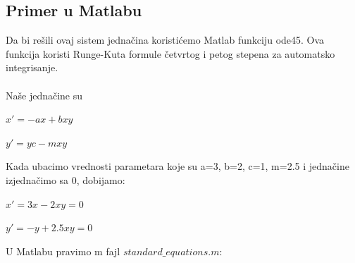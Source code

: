 \documentclass[a4paper]{article}
\begin{document}
\subsection{Primer u Matlabu}
\label{sub:std_primer}
Da bi rešili ovaj sistem jednačina koristićemo Matlab funkciju ode45. Ova funkcija koristi Runge-Kuta
formule četvrtog i petog stepena za automatsko integrisanje.\\ \\
 Naše jednačine su
	\begin{center}
		$x' = -ax + bxy$
	\end{center}
	\begin{center}
		$y' =yc - mxy$
	\end{center}
Kada ubacimo vrednosti parametara koje su a=3, b=2, c=1, m=2.5 i jednačine izjednačimo sa 0, dobijamo:
	\begin{center}
		$x'=3x - 2xy = 0$
	\end{center}
	\begin{center}
		$y'=-y + 2.5xy = 0$
	\end{center}
U Matlabu pravimo m fajl $ standard\_equations.m $:


\end{document}
